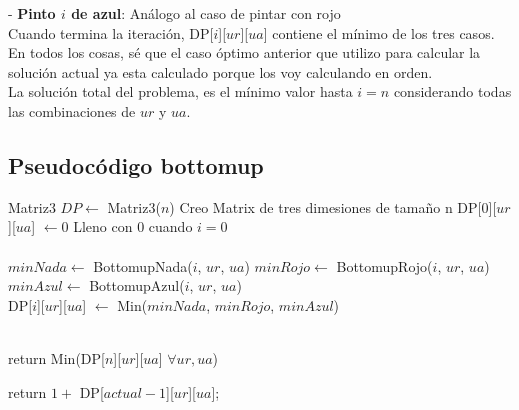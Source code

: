 - \textbf{Pinto $i$ de azul}:  Análogo al caso de pintar con rojo  \\

Cuando termina la iteración, DP[$i$][$ur$][$ua$] contiene el mínimo de los tres casos. En todos los cosas, sé que el caso óptimo anterior que utilizo para calcular la solución actual ya esta calculado porque los voy calculando en orden. \\

La solución total del problema, es el mínimo valor hasta $i = n$ considerando todas las combinaciones de $ur$ y $ua$.

\subsection{Pseudocódigo bottomup}



\begin{algorithm}[H]
\begin{algorithmic}
  \State Matriz3 $DP \gets$ Matriz3($n$)  \Comment Creo Matrix de tres dimesiones de tamaño n 
  \State DP[$0$][$ur$][$ua$] $\gets 0$  \Comment Lleno con $0$ cuando $i = 0$ \\

             \\

                \State $minNada \gets$ BottomupNada($i$, $ur$, $ua$)
                \State $minRojo \gets$ BottomupRojo($i$, $ur$, $ua$)
                \State $minAzul \gets$ BottomupAzul($i$, $ur$, $ua$) \\  

                \State DP[$i$][$ur$][$ua$] $\gets$ Min($minNada$, $minRojo$, $minAzul$)
            
            \EndFor
        \EndFor
    \EndFor \\

    \State return Min(DP[$n$][$ur$][$ua$] $\forall ur, ua$)

\EndProcedure
\end{algorithmic}
\end{algorithm}



\begin{algorithm}[H]
\begin{algorithmic}
    \State return $1 +$ DP[$actual-1$][$ur$][$ua$];
\EndProcedure
\end{algorithmic}
\end{algorithm}


